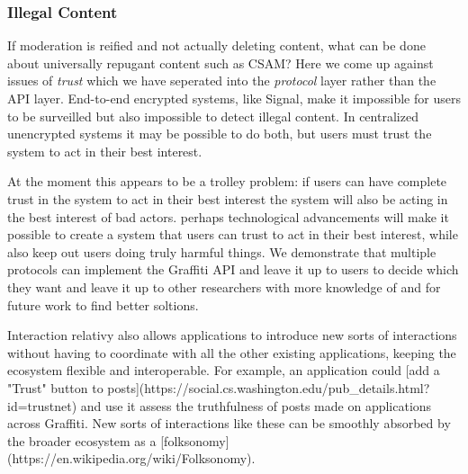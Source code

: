 
\subsubsection{Illegal Content}

If moderation is reified and not actually deleting content,
what can be done about universally repugant content such as CSAM?
Here we come up against issues of \emph{trust} which we
have seperated into the \emph{protocol} layer rather than
the API layer.
End-to-end encrypted systems, like Signal, make it impossible
for users to be surveilled but also impossible to detect illegal content.
In centralized unencrypted systems it may be possible to do both, but
users must trust the system to act in their best interest.

At the moment this appears to be a trolley problem:
if users can have complete trust in the system to act in their
best interest the system will also be acting in the best interest
of bad actors.
perhaps technological advancements will make it possible to create
a system that users can trust to act in their best interest,
while also keep out users doing truly harmful things.
We demonstrate that multiple protocols can implement the
Graffiti API and leave it up to users to decide which they want
and leave it up to other researchers with more knowledge of
and for future work to find better soltions.


Interaction relativy also allows applications to introduce new sorts of interactions
without having to coordinate with all the other existing applications,
keeping the ecosystem flexible and interoperable.
For example, an application could [add a "Trust" button to posts](https://social.cs.washington.edu/pub_details.html?id=trustnet)
and use it assess the truthfulness of posts made on applications across Graffiti.
New sorts of interactions like these can be smoothly absorbed by the broader ecosystem
as a [folksonomy](https://en.wikipedia.org/wiki/Folksonomy).

